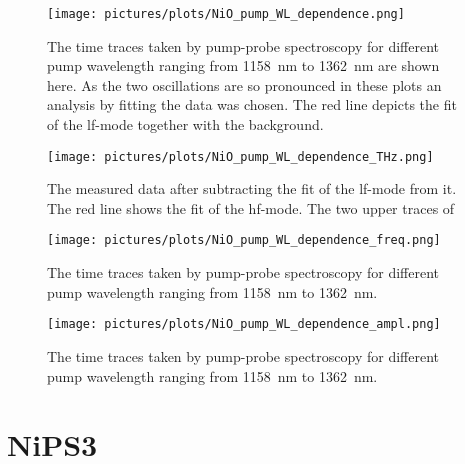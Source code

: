 \begin{figure}[ht]
    \centering
    \texttt{[image: pictures/plots/NiO\_pump\_WL\_dependence.png]}
    \caption{The time traces taken by pump-probe spectroscopy for different pump wavelength ranging from \qty{1158}{nm} to \qty{1362}{nm} are shown here. As the two oscillations are so pronounced in these plots an analysis by fitting the data was chosen. The red line depicts the fit of the lf-mode together with the background.}
    \label{fig:NiO_pump_WL_dependence}
\end{figure}

\begin{figure}[ht]
    \centering
    \texttt{[image: pictures/plots/NiO\_pump\_WL\_dependence\_THz.png]}
    \caption{The measured data after subtracting the fit of the lf-mode from it. The red line shows the fit of the hf-mode. The two upper traces of }
    \label{fig:NiO_pump_WL_dependence_THz}
\end{figure}
\begin{figure}[ht]
    \centering
    \texttt{[image: pictures/plots/NiO\_pump\_WL\_dependence\_freq.png]}
    \caption{The time traces taken by pump-probe spectroscopy for different pump wavelength ranging from \qty{1158}{nm} to \qty{1362}{nm}.}
    \label{fig:NiO_pump_WL_dependence_freq}
\end{figure}
\begin{figure}[ht]
    \centering
    \texttt{[image: pictures/plots/NiO\_pump\_WL\_dependence\_ampl.png]}
    \caption{The time traces taken by pump-probe spectroscopy for different pump wavelength ranging from \qty{1158}{nm} to \qty{1362}{nm}.}
    \label{fig:NiO_pump_WL_dependence_ampl}
\end{figure}



\section{NiPS3}
